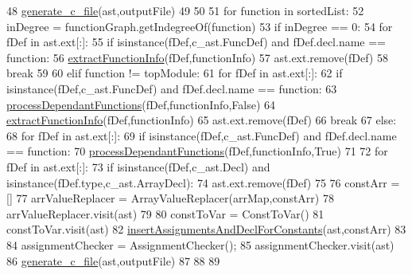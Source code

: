 \begin{DoxyCode}
48         \hyperlink{namespaceutils_a5ab527c9affdfd39949f2e88c4299989}{generate\_c\_file}(ast,outputFile)
49 
50 
51     \textcolor{keywordflow}{for} function \textcolor{keywordflow}{in} sortedList:
52         inDegree = functionGraph.getIndegreeOf(function)
53         \textcolor{keywordflow}{if} inDegree == 0:
54             \textcolor{keywordflow}{for} fDef \textcolor{keywordflow}{in} ast.ext[:]:
55                 \textcolor{keywordflow}{if} isinstance(fDef,c\_ast.FuncDef) \textcolor{keywordflow}{and} fDef.decl.name == function:
56                     \hyperlink{namespaceutils_a01c8b36149daaab35946bf42cf90fcc1}{extractFunctionInfo}(fDef,functionInfo)
57                     ast.ext.remove(fDef)
58                     \textcolor{keywordflow}{break}
59         
60         \textcolor{keywordflow}{elif} function != topModule:
61             \textcolor{keywordflow}{for} fDef \textcolor{keywordflow}{in} ast.ext[:]:
62                 \textcolor{keywordflow}{if} isinstance(fDef,c\_ast.FuncDef) \textcolor{keywordflow}{and} fDef.decl.name == function:
63                     \hyperlink{namespaceutils_a6c1d5e886507ec0741fb0fce3f642c5b}{processDependantFunctions}(fDef,functionInfo,\textcolor{keyword}{False})
64                     \hyperlink{namespaceutils_a01c8b36149daaab35946bf42cf90fcc1}{extractFunctionInfo}(fDef,functionInfo)
65                     ast.ext.remove(fDef)
66                     \textcolor{keywordflow}{break}
67         \textcolor{keywordflow}{else}:
68             \textcolor{keywordflow}{for} fDef \textcolor{keywordflow}{in} ast.ext[:]:
69                 \textcolor{keywordflow}{if} isinstance(fDef,c\_ast.FuncDef) \textcolor{keywordflow}{and} fDef.decl.name == function:
70                     \hyperlink{namespaceutils_a6c1d5e886507ec0741fb0fce3f642c5b}{processDependantFunctions}(fDef,functionInfo,\textcolor{keyword}{True})
71     
72     \textcolor{keywordflow}{for} fDef \textcolor{keywordflow}{in} ast.ext[:]:
73         \textcolor{keywordflow}{if} isinstance(fDef,c\_ast.Decl) \textcolor{keywordflow}{and} isinstance(fDef.type,c\_ast.ArrayDecl):
74             ast.ext.remove(fDef)
75 
76     constArr = []
77     arrValueReplacer = ArrayValueReplacer(arrMap,constArr)
78     arrValueReplacer.visit(ast)
79 
80     constToVar = ConstToVar()
81     constToVar.visit(ast)
82     \hyperlink{namespaceutils_a694fa47d55cc41b3f9e86ab2f90e98f3}{insertAssignmentsAndDeclForConstants}(ast,constArr)
83 
84     assignmentChecker = AssignmentChecker();
85     assignmentChecker.visit(ast)
86     \hyperlink{namespaceutils_a5ab527c9affdfd39949f2e88c4299989}{generate\_c\_file}(ast,outputFile)
87 
88 
89 
\end{DoxyCode}
